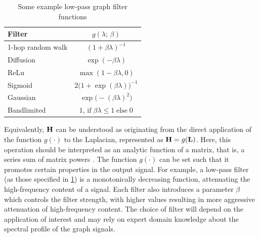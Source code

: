 \begin{table}[t]
    \vspace*{0.5cm}
    \centering
    \setlength{\tabcolsep}{10pt}
    \def\arraystretch{1.8}
    \begin{tabular}{@{}l c@{}}
        \toprule
        \textbf{Filter}   & $g(\lambda; \,\beta)$   \\
        \midrule
        1-hop random walk & $(1 + \beta \lambda)^{-1}$ \\
        Diffusion         & $\exp(-\beta \lambda)$\\
        ReLu              & $\max (1 - \beta \lambda, 0)$\\
        Sigmoid           & $2 \big( 1 + \exp(\beta \lambda)\big)^{-1}$\\
        Gaussian          & $\exp \big(-(\beta \lambda)^2\big)$\\
        Bandlimited       & $1, \,\text{if} \; \beta \lambda \leq 1 \; \text{else} \; 0$ \\
        \bottomrule
    \end{tabular}
    \caption[Example graph filter functions]{Some example low-pass graph filter functions}
    \label{tab:iso_filters}
    \vspace*{0.5cm}
\end{table}


Equivalently, $\mathbf{H}$ can be understood as originating from the direct application of the function $g(\cdot)$ to the Laplacian, represented as $\mathbf{H} = g(\mathbf{L})$. Here, this operation should be interpreted as an analytic function of a matrix, that is, a series sum of matrix powers \citep{Bhatia1997}. The function $g(\cdot)$ can be set such that it promotes certain properties in the output signal. For example, a low-pass filter (as those specified in \cref{tab:iso_filters}) is a monotonically decreasing function, attenuating the high-frequency content of a signal. Each filter also introduces a parameter $\beta$ which controls the filter strength, with higher values resulting in more aggressive attenuation of high-frequency content. The choice of filter will depend on the application of interest and may rely on expert domain knowledge about the spectral profile of the graph signals. 

